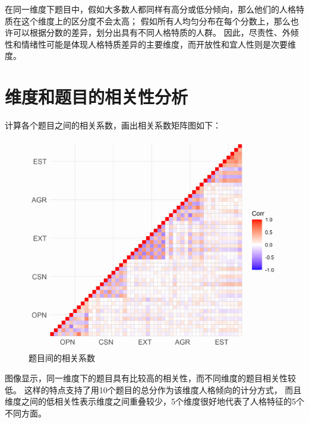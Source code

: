 \documentclass[UTF8]{ctexart}
\begin{document}
在同一维度下题目中，假如大多数人都同样有高分或低分倾向，那么他们的人格特质在这个维度上的区分度不会太高；
假如所有人均匀分布在每个分数上，那么也许可以根据分数的差异，划分出具有不同人格特质的人群。
因此，尽责性、外倾性和情绪性可能是体现人格特质差异的主要维度，而开放性和宜人性则是次要维度。
\section{维度和题目的相关性分析}
计算各个题目之间的相关系数，画出相关系数矩阵图如下：
\begin{figure}[H]
  \centering
  \includegraphics[scale=0.7]{Corrplot_Item.png}
  \caption{题目间的相关系数}
\end{figure}
图像显示，同一维度下的题目具有比较高的相关性，而不同维度的题目相关性较低。
这样的特点支持了用10个题目的总分作为该维度人格倾向的计分方式，
而且维度之间的低相关性表示维度之间重叠较少，5个维度很好地代表了人格特征的5个不同方面。
\end{document}
